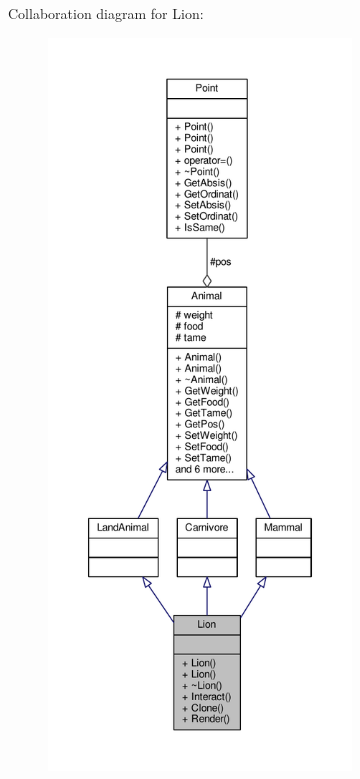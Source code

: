 Collaboration diagram for Lion\+:
\nopagebreak
\begin{figure}[H]
\begin{center}
\leavevmode
\includegraphics[height=550pt]{classLion__coll__graph}
\end{center}
\end{figure}
